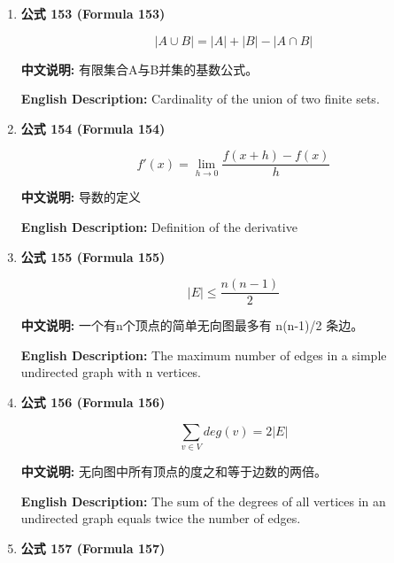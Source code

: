 \documentclass[12pt,a4paper]{article}
\begin{document}
\begin{enumerate}[leftmargin=*]
\item \textbf{公式 153 (Formula 153)}

\begin{equation}
|A \cup B| = |A| + |B| - |A \cap B|
\end{equation}

\textbf{中文说明:} 有限集合A与B并集的基数公式。

\textbf{English Description:} Cardinality of the union of two finite sets.

\vspace{0.5cm}

\item \textbf{公式 154 (Formula 154)}

\begin{equation}
f'(x) = \lim_{h \to 0} \frac{f(x+h) - f(x)}{h}
\end{equation}

\textbf{中文说明:} 导数的定义

\textbf{English Description:} Definition of the derivative

\vspace{0.5cm}

\item \textbf{公式 155 (Formula 155)}

\begin{equation}
|E| \leq \frac{n(n-1)}{2}
\end{equation}

\textbf{中文说明:} 一个有n个顶点的简单无向图最多有 n(n-1)/2 条边。

\textbf{English Description:} The maximum number of edges in a simple undirected graph with n vertices.

\vspace{0.5cm}

\item \textbf{公式 156 (Formula 156)}

\begin{equation}
\sum_{v \in V} deg(v) = 2|E|
\end{equation}

\textbf{中文说明:} 无向图中所有顶点的度之和等于边数的两倍。

\textbf{English Description:} The sum of the degrees of all vertices in an undirected graph equals twice the number of edges.

\vspace{0.5cm}

\item \textbf{公式 157 (Formula 157)}


\end{enumerate}
\end{document}
